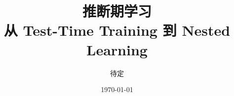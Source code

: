 \title{
  {\huge\bfseries 推断期学习}\\\vspace{0.5em}
  {\large 从 Test-Time Training 到 Nested Learning}
}
\author{待定}
\date{\today}
\maketitle
\thispagestyle{empty}
